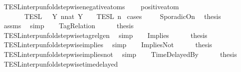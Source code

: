 \begin{isabellebody}
\isamarkupfalse%
\ TESL{\isacharunderscore}interp{\isacharunderscore}unfold{\isacharunderscore}stepwise{\isacharunderscore}negative{\isacharunderscore}atoms{\isacharcolon}\isanewline
\ \ \ {\isacartoucheopen}{\isasymnot}\ positive{\isacharunderscore}atom\ {\isasymphi}{\isacartoucheclose}\isanewline
\ \ \ \ \ {\isacartoucheopen}{\isasymlbrakk}\ {\isasymphi}\ {\isasymrbrakk}\isactrlsub T\isactrlsub E\isactrlsub S\isactrlsub L\ {\isacharequal}\ {\isasymInter}\ {\isacharbraceleft}Y{\isachardot}\ {\isasymexists}n{\isacharcolon}{\isacharcolon}nat{\isachardot}\ Y\ {\isacharequal}\ {\isasymlbrakk}\ {\isasymphi}\ {\isasymrbrakk}\isactrlsub T\isactrlsub E\isactrlsub S\isactrlsub L\isactrlbsup {\isasymge}\ n\isactrlesup {\isacharbraceright}{\isacartoucheclose}\isanewline
%
\isadelimproof
%
\endisadelimproof
%
\isatagproof
{}\isamarkupfalse%
\ {\isacharparenleft}cases\ {\isasymphi}{\isacharparenright}\isanewline
\ \ \isamarkupfalse%
\ SporadicOn\ \isamarkupfalse%
\ {\isacharquery}thesis\ \isamarkupfalse%
\ assms\ \isamarkupfalse%
\ simp\isanewline
{}\isamarkupfalse%
\isanewline
\ \ \isamarkupfalse%
\ TagRelation\isanewline
\ \ \ \ \isamarkupfalse%
\ {\isacharquery}thesis\ \isamarkupfalse%
\ TESL{\isacharunderscore}interp{\isacharunderscore}unfold{\isacharunderscore}stepwise{\isacharunderscore}tagrelgen\ \isamarkupfalse%
\ simp\isanewline
{}\isamarkupfalse%
\isanewline
\ \ \isamarkupfalse%
\ Implies\isanewline
\ \ \ \ \isamarkupfalse%
\ {\isacharquery}thesis\ \isamarkupfalse%
\ TESL{\isacharunderscore}interp{\isacharunderscore}unfold{\isacharunderscore}stepwise{\isacharunderscore}implies\ \isamarkupfalse%
\ simp\isanewline
{}\isamarkupfalse%
\isanewline
\ \ \isamarkupfalse%
\ ImpliesNot\isanewline
\ \ \ \ \isamarkupfalse%
\ {\isacharquery}thesis\ \isamarkupfalse%
\ TESL{\isacharunderscore}interp{\isacharunderscore}unfold{\isacharunderscore}stepwise{\isacharunderscore}implies{\isacharunderscore}not\ \isamarkupfalse%
\ simp\isanewline
{}\isamarkupfalse%
\isanewline
\ \ \isamarkupfalse%
\ TimeDelayedBy\isanewline
\ \ \ \ \isamarkupfalse%
\ {\isacharquery}thesis\ \isamarkupfalse%
\ TESL{\isacharunderscore}interp{\isacharunderscore}unfold{\isacharunderscore}stepwise{\isacharunderscore}timedelayed\ \isamarkupfalse%

\end{isabellebody}
